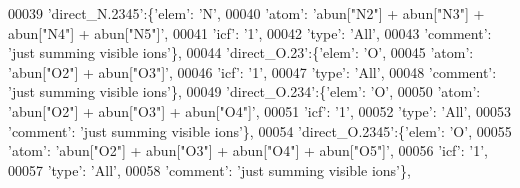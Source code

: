 \begin{DoxyCode}
00039                          \textcolor{stringliteral}{'direct\_N.2345'}:\{\textcolor{stringliteral}{'elem'}: \textcolor{stringliteral}{'N'},
00040                                        \textcolor{stringliteral}{'atom'}: \textcolor{stringliteral}{'abun["N2"] + abun["N3"] + abun["N4"] + abun["N5"]'},
00041                                        \textcolor{stringliteral}{'icf'}: \textcolor{stringliteral}{'1'},
00042                                        \textcolor{stringliteral}{'type'}: \textcolor{stringliteral}{'All'},
00043                                        \textcolor{stringliteral}{'comment'}: \textcolor{stringliteral}{'just summing visible ions'}\},
00044                          \textcolor{stringliteral}{'direct\_O.23'}:\{\textcolor{stringliteral}{'elem'}: \textcolor{stringliteral}{'O'},
00045                                        \textcolor{stringliteral}{'atom'}: \textcolor{stringliteral}{'abun["O2"] + abun["O3"]'},
00046                                        \textcolor{stringliteral}{'icf'}: \textcolor{stringliteral}{'1'},
00047                                        \textcolor{stringliteral}{'type'}: \textcolor{stringliteral}{'All'},
00048                                        \textcolor{stringliteral}{'comment'}: \textcolor{stringliteral}{'just summing visible ions'}\},
00049                          \textcolor{stringliteral}{'direct\_O.234'}:\{\textcolor{stringliteral}{'elem'}: \textcolor{stringliteral}{'O'},
00050                                        \textcolor{stringliteral}{'atom'}: \textcolor{stringliteral}{'abun["O2"] + abun["O3"] + abun["O4"]'},
00051                                        \textcolor{stringliteral}{'icf'}: \textcolor{stringliteral}{'1'},
00052                                        \textcolor{stringliteral}{'type'}: \textcolor{stringliteral}{'All'},
00053                                        \textcolor{stringliteral}{'comment'}: \textcolor{stringliteral}{'just summing visible ions'}\},
00054                          \textcolor{stringliteral}{'direct\_O.2345'}:\{\textcolor{stringliteral}{'elem'}: \textcolor{stringliteral}{'O'},
00055                                        \textcolor{stringliteral}{'atom'}: \textcolor{stringliteral}{'abun["O2"] + abun["O3"] + abun["O4"] + abun["O5"]'},
00056                                        \textcolor{stringliteral}{'icf'}: \textcolor{stringliteral}{'1'},
00057                                        \textcolor{stringliteral}{'type'}: \textcolor{stringliteral}{'All'},
00058                                        \textcolor{stringliteral}{'comment'}: \textcolor{stringliteral}{'just summing visible ions'}\},

\end{DoxyCode}
